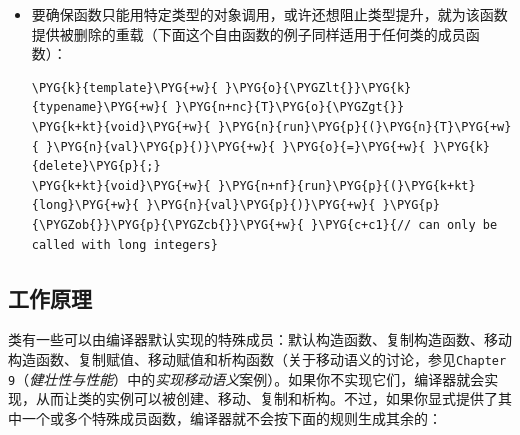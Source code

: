 \begin{itemize}

\item 要确保函数只能用特定类型的对象调用，或许还想阻止类型提升，就为该函数提供被删除的重载（下面这个自由函数的例子同样适用于任何类的成员函数）：



\begin{codeblockbg}
\begin{Verbatim}[commandchars=\\\{\},breaklines=true,breakanywhere=true,fontsize=\codefont,xleftmargin=17bp]
\PYG{k}{template}\PYG{+w}{ }\PYG{o}{\PYGZlt{}}\PYG{k}{typename}\PYG{+w}{ }\PYG{n+nc}{T}\PYG{o}{\PYGZgt{}}
\PYG{k+kt}{void}\PYG{+w}{ }\PYG{n}{run}\PYG{p}{(}\PYG{n}{T}\PYG{+w}{ }\PYG{n}{val}\PYG{p}{)}\PYG{+w}{ }\PYG{o}{=}\PYG{+w}{ }\PYG{k}{delete}\PYG{p}{;}
\PYG{k+kt}{void}\PYG{+w}{ }\PYG{n+nf}{run}\PYG{p}{(}\PYG{k+kt}{long}\PYG{+w}{ }\PYG{n}{val}\PYG{p}{)}\PYG{+w}{ }\PYG{p}{\PYGZob{}}\PYG{p}{\PYGZcb{}}\PYG{+w}{ }\PYG{c+c1}{// can only be called with long integers}
\end{Verbatim}
\end{codeblockbg}

\end{itemize}



\subsection{工作原理}



类有一些可以由编译器默认实现的特殊成员：默认构造函数、复制构造函数、移动构造函数、复制赋值、移动赋值和析构函数（关于移动语义的讨论，参见\texttt{Chapter 9}（\textit{健壮性与性能}）中的\textit{实现移动语义}案例）。如果你不实现它们，编译器就会实现，从而让类的实例可以被创建、移动、复制和析构。不过，如果你显式提供了其中一个或多个特殊成员函数，编译器就不会按下面的规则生成其余的：



